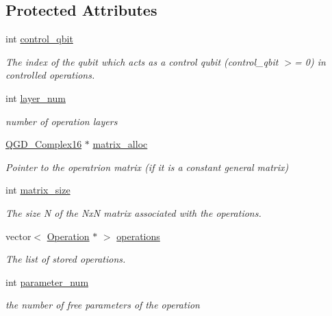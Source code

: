 \subsection*{Protected Attributes}
\begin{DoxyCompactItemize}
\item 
int \hyperlink{class_operation_a9a798ea8adec5a45fd2ca07996da88e1}{control\+\_\+qbit}
\begin{DoxyCompactList}\small\item\em The index of the qubit which acts as a control qubit (control\+\_\+qbit $>$= 0) in controlled operations. \end{DoxyCompactList}\item 
int \hyperlink{class_operation__block_a907101b9a80e6ebeaa96cc7b973cf413}{layer\+\_\+num}
\begin{DoxyCompactList}\small\item\em number of operation layers \end{DoxyCompactList}\item 
\hyperlink{struct_q_g_d___complex16}{Q\+G\+D\+\_\+\+Complex16} $\ast$ \hyperlink{class_operation_ade4d28d271ca13950d04363aac1c382e}{matrix\+\_\+alloc}
\begin{DoxyCompactList}\small\item\em Pointer to the operatrion matrix (if it is a constant general matrix) \end{DoxyCompactList}\item 
int \hyperlink{class_operation_a8236c07112cb165a00d3869363808624}{matrix\+\_\+size}
\begin{DoxyCompactList}\small\item\em The size N of the NxN matrix associated with the operations. \end{DoxyCompactList}\item 
vector$<$ \hyperlink{class_operation}{Operation} $\ast$ $>$ \hyperlink{class_operation__block_a1efec4139888e591b59acd7b84497af1}{operations}
\begin{DoxyCompactList}\small\item\em The list of stored operations. \end{DoxyCompactList}\item 
int \hyperlink{class_operation_aa57505afe5b5ec27f6d053044b86e043}{parameter\+\_\+num}
\begin{DoxyCompactList}\small\item\em the number of free parameters of the operation \end{DoxyCompactList}\item 

\end{DoxyCompactItemize}
